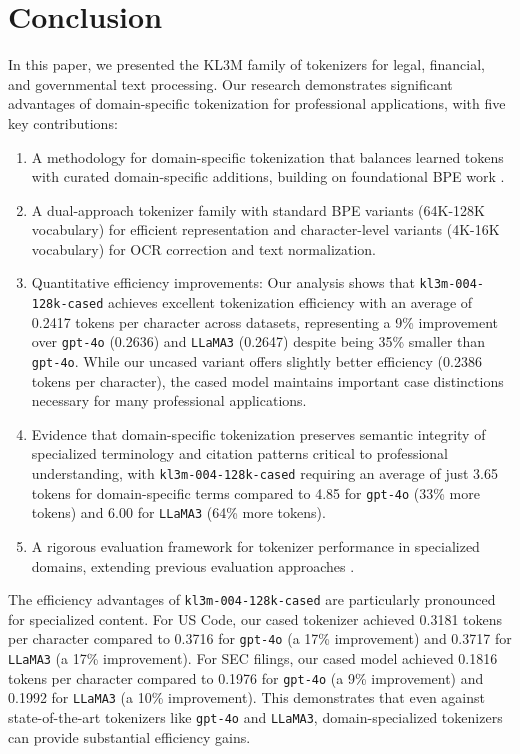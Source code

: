 \section{Conclusion}

In this paper, we presented the KL3M family of tokenizers for legal, financial, and governmental text processing. Our research demonstrates significant advantages of domain-specific tokenization for professional applications, with five key contributions:

\begin{enumerate}
    \item A methodology for domain-specific tokenization that balances learned tokens with curated domain-specific additions, building on foundational BPE work \cite{sennrich2016neural}.
    
    \item A dual-approach tokenizer family with standard BPE variants (64K-128K vocabulary) for efficient representation and character-level variants (4K-16K vocabulary) for OCR correction and text normalization.
    
    \item Quantitative efficiency improvements: Our analysis shows that \texttt{kl3m-004-128k-cased} achieves excellent tokenization efficiency with an average of 0.2417 tokens per character across datasets, representing a 9\% improvement over \texttt{gpt-4o} (0.2636) and \texttt{LLaMA3} (0.2647) despite being 35\% smaller than \texttt{gpt-4o}. While our uncased variant offers slightly better efficiency (0.2386 tokens per character), the cased model maintains important case distinctions necessary for many professional applications.
    
    \item Evidence that domain-specific tokenization preserves semantic integrity of specialized terminology and citation patterns critical to professional understanding, with \texttt{kl3m-004-128k-cased} requiring an average of just 3.65 tokens for domain-specific terms compared to 4.85 for \texttt{gpt-4o} (33\% more tokens) and 6.00 for \texttt{LLaMA3} (64\% more tokens).
    
    \item A rigorous evaluation framework for tokenizer performance in specialized domains, extending previous evaluation approaches \cite{rust2020good}.
\end{enumerate}

The efficiency advantages of \texttt{kl3m-004-128k-cased} are particularly pronounced for specialized content. For US Code, our cased tokenizer achieved 0.3181 tokens per character compared to 0.3716 for \texttt{gpt-4o} (a 17\% improvement) and 0.3717 for \texttt{LLaMA3} (a 17\% improvement). For SEC filings, our cased model achieved 0.1816 tokens per character compared to 0.1976 for \texttt{gpt-4o} (a 9\% improvement) and 0.1992 for \texttt{LLaMA3} (a 10\% improvement). This demonstrates that even against state-of-the-art tokenizers like \texttt{gpt-4o} and \texttt{LLaMA3}, domain-specialized tokenizers can provide substantial efficiency gains.

